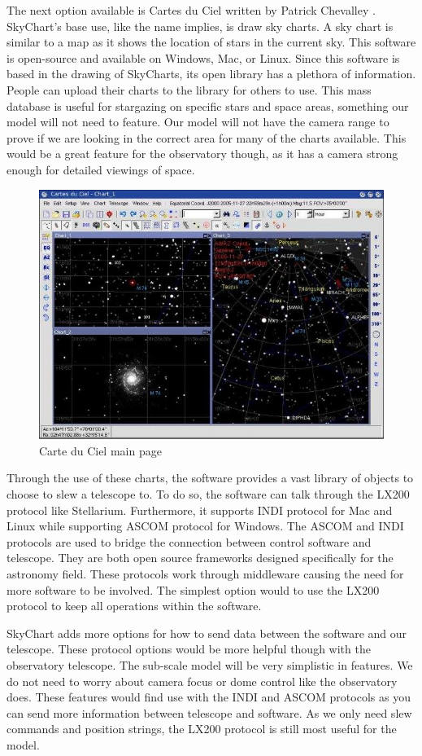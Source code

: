 \documentclass[12pt]{report}
\begin{document}
The next option available is Cartes du Ciel written by Patrick Chevalley \cite{skychart}. SkyChart's base use, like the name implies, is draw sky charts. A sky chart is similar to a map as it shows the location of stars in the current sky. This software is open-source and available on Windows, Mac, or Linux. Since this software is based in the drawing of SkyCharts, its open library has a plethora of information. People can upload their charts to the library for others to use. This mass database is useful for stargazing on specific stars and space areas, something our model will not need to feature. Our model will not have the camera range to prove if we are looking in the correct area for many of the charts available. This would be a great feature for the observatory though, as it has a camera strong enough for detailed viewings of space.

\begin{figure}[h]
	\centering
	\includegraphics[width=0.75\linewidth]{carte}
	\caption{Carte du Ciel main page}
\end{figure}

Through the use of these charts, the software provides a vast library of objects to choose to slew a telescope to. To do so, the software can talk through the LX200 protocol like Stellarium. Furthermore, it supports INDI protocol for Mac and Linux while supporting ASCOM protocol for Windows. The ASCOM and INDI protocols are used to bridge the connection between control software and telescope. They are both open source frameworks designed specifically for the astronomy field. These protocols work through middleware causing the need for more software to be involved. The simplest option would to use the LX200 protocol to keep all operations within the software.

SkyChart adds more options for how to send data between the software and our telescope. These protocol options would be more helpful though with the observatory telescope. The sub-scale model will be very simplistic in features. We do not need to worry about camera focus or dome control like the observatory does. These features would find use with the INDI and ASCOM protocols as you can send more information between telescope and software. As we only need slew commands and position strings, the LX200 protocol is still most useful for the model.
\end{document}
